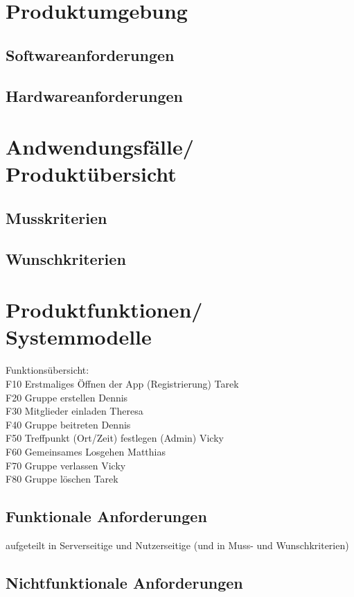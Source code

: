 \documentclass[parskip=full]{scrartcl}
\begin{document}
\section{Produktumgebung}
\subsection{Softwareanforderungen}
\subsection{Hardwareanforderungen}

\section{Andwendungsfälle/ Produktübersicht}
\subsection{Musskriterien}
\subsection{Wunschkriterien}



\section{Produktfunktionen/ Systemmodelle}
Funktionsübersicht: \\
F10 Erstmaliges Öffnen der App (Registrierung) Tarek \\
F20 Gruppe erstellen Dennis \\
F30 Mitglieder einladen Theresa \\
F40 Gruppe beitreten Dennis \\
F50 Treffpunkt (Ort/Zeit) festlegen (Admin) Vicky \\
F60 Gemeinsames Losgehen Matthias \\
F70 Gruppe verlassen Vicky \\
F80 Gruppe löschen Tarek \\
\subsection{Funktionale Anforderungen}
aufgeteilt in Serverseitige und Nutzerseitige (und in Muss- und Wunschkriterien)
\subsection{Nichtfunktionale Anforderungen}
\end{document}

